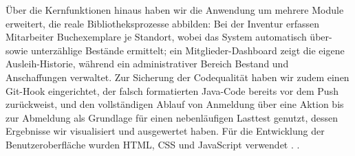 Über die Kernfunktionen hinaus haben wir die Anwendung um mehrere Module erweitert, die reale Bibliotheksprozesse abbilden: Bei der Inventur erfassen Mitarbeiter Buchexemplare je Standort, wobei das System automatisch über- sowie unterzählige Bestände ermittelt; ein Mitglieder-Dashboard zeigt die eigene Ausleih-Historie, während ein administrativer Bereich Bestand und Anschaffungen verwaltet. Zur Sicherung der Codequalität haben wir zudem einen Git-Hook eingerichtet, der falsch formatierten Java-Code bereits vor dem Push zurückweist, und den vollständigen Ablauf von Anmeldung über eine Aktion bis zur Abmeldung als Grundlage für einen nebenläufigen Lasttest genutzt, dessen Ergebnisse wir visualisiert und ausgewertet haben.
Für die Entwicklung der Benutzeroberfläche wurden HTML, CSS und JavaScript verwendet \autocite{w3school}.
 \autocite{JavaDoc}.
